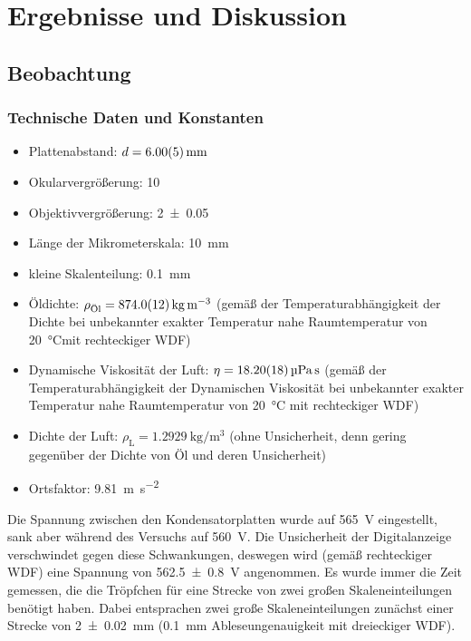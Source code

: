 \documentclass[
	a4paper,
	12pt,
	pagesize,
	ngerman
]{scrartcl}
\begin{document}
	
	\section{Ergebnisse und Diskussion}
	

	\subsection{Beobachtung}
	\subsubsection*{Technische Daten und Konstanten} %
	\begin{itemize}
		\item Plattenabstand: $d=\SI{6 \pm 0,05}{mm}$
		\item Okularvergrößerung: 10
		\item Objektivvergrößerung: \SI{2 \pm 0,05}{}
		\item Länge der Mikrometerskala: \SI{10}{mm}
		\item kleine Skalenteilung: \SI{0,1}{mm}
		\item Öldichte: $\rho_\text{Öl} = \SI{874 \pm 1,2}{\kilogram \per \metre \cubed} $ (gemäß der Temperaturabhängigkeit der Dichte bei unbekannter exakter Temperatur nahe Raumtemperatur von \SI{20}{\degreeCelsius}mit rechteckiger WDF)
		\item Dynamische Viskosität der Luft: $\eta = \SI{18,2 \pm 0,18}{\micro \pascal \second} $ (gemäß der Temperaturabhängigkeit der Dynamischen Viskosität bei unbekannter exakter Temperatur nahe Raumtemperatur von \SI{20}{\degreeCelsius} mit rechteckiger WDF)
		\item Dichte der Luft: $\rho_\text{L}= \SI{1,2929}{\kilogram \per \metre \cubed}$ (ohne Unsicherheit, denn gering gegenüber der Dichte von Öl und deren Unsicherheit)
		\item Ortsfaktor: \SI{9,81}{\meter \per \second \squared}
	\end{itemize}
	Die Spannung zwischen den Kondensatorplatten wurde auf \SI{565}{V} eingestellt, sank aber während des Versuchs auf \SI{560}{V}.
	Die Unsicherheit der Digitalanzeige verschwindet gegen diese Schwankungen, deswegen wird (gemäß rechteckiger WDF) eine Spannung von \SI{562,5 \pm 0,8}{V} angenommen.
	Es wurde immer die Zeit gemessen, die die Tröpfchen für eine Strecke von zwei großen Skaleneinteilungen benötigt haben.
	Dabei entsprachen zwei große Skaleneinteilungen zunächst einer Strecke von \SI{2\pm 0,02}{mm} (\SI{0,1}{mm} Ableseungenauigkeit mit dreieckiger WDF).
\end{document}
